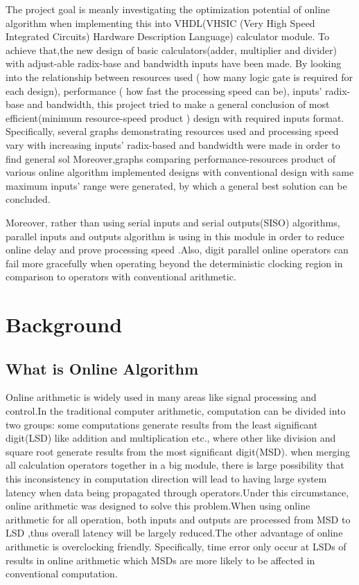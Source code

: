 \documentclass[10pt]{article}
\begin{document}
The project goal is meanly investigating the optimization potential of online algorithm when implementing this into  VHDL(VHSIC (Very High Speed Integrated Circuits) Hardware Description Language)  calculator module. To achieve that,the new design of basic calculators(adder, multiplier and divider)  with adjust-able radix-base and bandwidth inputs have been made. By looking into the relationship between resources used ( how many logic gate is required for each design), performance ( how fast the processing speed can be), inputs' radix-base and bandwidth, this project tried to make a general conclusion of most efficient(minimum resource-speed product ) design with required inputs format. Specifically, several graphs demonstrating resources used and processing speed vary with increasing inputs' radix-based and bandwidth were made in order to find general sol Moreover,graphs comparing  performance-resources product of various online algorithm implemented designs with conventional design with same maximum inputs' range were generated, by which a general best solution can be concluded.
    
Moreover, rather than using serial inputs and serial outputs(SISO) algorithms, parallel inputs and outputs algorithm is using in this module in order to reduce online delay and prove processing speed .Also, digit parallel online operators can fail more gracefully when operating beyond the deterministic clocking region in comparison to operators with conventional arithmetic.
    
    
\section{Background}

\subsection{What is Online Algorithm}
Online arithmetic is widely used in many areas like signal processing and control.In the traditional computer arithmetic, computation can be divided into two groups: some computations generate results from the least significant digit(LSD) like addition and multiplication etc., where other like division and square root generate results from the most significant digit(MSD). when merging all calculation operators together in a big module, there is large possibility that this inconsistency in computation direction will lead to having large system latency  when data being propagated through operators.Under this circumstance, online arithmetic was designed to solve this problem\cite{c1}\cite{c2}.When using online arithmetic for all operation, both inputs and outputs are processed from MSD to LSD ,thus overall latency will be largely reduced.The other advantage of online arithmetic is overclocking friendly. Specifically, time error only occur at LSDs of results in online arithmetic which MSDs are more likely to be affected in conventional computation\cite{c3}.
    
\end{document}
